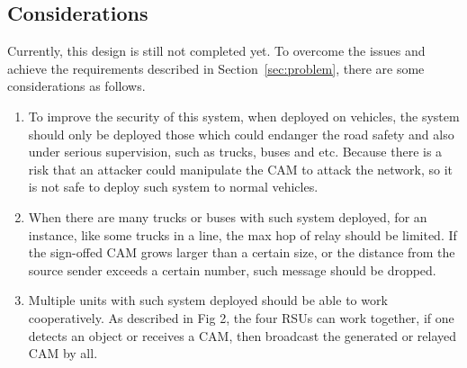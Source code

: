 \subsection{Considerations}

Currently, this design is still not completed yet.
To overcome the issues and achieve the requirements described in Section~\ref{sec:problem}, there are some considerations as follows.
\begin{enumerate}
\item To improve the security of this system,
    when deployed on vehicles,
    the system should only be deployed those which could endanger the road safety and also under serious supervision,
    such as trucks, buses and etc.
    Because there is a risk that an attacker could manipulate the CAM to attack the network,
    so it is not safe to deploy such system to normal vehicles.

\item When there are many trucks or buses with such system deployed,
    for an instance, like some trucks in a line, the max hop of relay should be limited.
    If the sign-offed CAM grows larger than a certain size,
    or the distance from the source sender exceeds a certain number, such message should be dropped.

\item Multiple units with such system deployed should be able to work cooperatively.
    As described in Fig 2, the four RSUs can work together,
    if one detects an object or receives a CAM, then broadcast the generated or relayed CAM by all.
\end{enumerate}